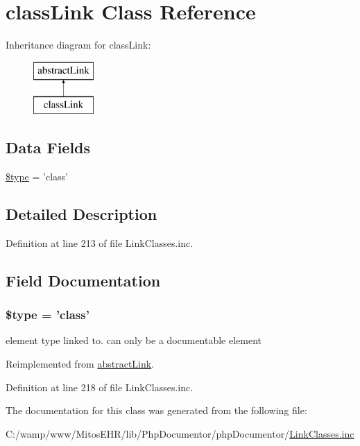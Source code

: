 \hypertarget{classclass_link}{\section{class\-Link \-Class \-Reference}
\label{classclass_link}
}
\-Inheritance diagram for class\-Link\-:\begin{figure}[H]
\begin{center}
\leavevmode
\includegraphics[height=2.000000cm]{classclass_link}
\end{center}
\end{figure}
\subsection*{\-Data \-Fields}
\begin{DoxyCompactItemize}
\item 
\hyperlink{classclass_link_a9a4a6fba2208984cabb3afacadf33919}{\$type} = 'class'
\end{DoxyCompactItemize}


\subsection{\-Detailed \-Description}


\-Definition at line 213 of file \-Link\-Classes.\-inc.



\subsection{\-Field \-Documentation}
\hypertarget{classclass_link_a9a4a6fba2208984cabb3afacadf33919}{
\subsubsection[{\$type}]{\setlength{\rightskip}{0pt plus 5cm}\$type = 'class'}}\label{classclass_link_a9a4a6fba2208984cabb3afacadf33919}
element type linked to. can only be a documentable element 

\-Reimplemented from \hyperlink{classabstract_link_a9a4a6fba2208984cabb3afacadf33919}{abstract\-Link}.



\-Definition at line 218 of file \-Link\-Classes.\-inc.



\-The documentation for this class was generated from the following file\-:\begin{DoxyCompactItemize}
\item 
\-C\-:/wamp/www/\-Mitos\-E\-H\-R/lib/\-Php\-Documentor/php\-Documentor/\hyperlink{_link_classes_8inc}{\-Link\-Classes.\-inc}\end{DoxyCompactItemize}
